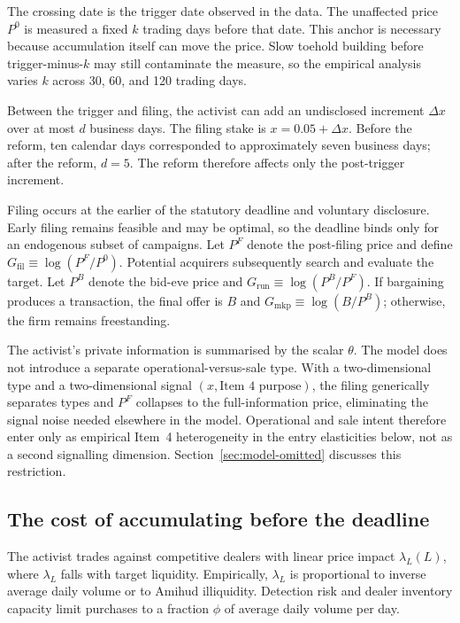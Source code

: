 The crossing date is the trigger date observed in the data. The unaffected
price $P^0$ is measured a fixed $k$ trading days before that date. This anchor
is necessary because accumulation itself can move the price. Slow toehold
building before trigger-minus-$k$ may still contaminate the measure, so the
empirical analysis varies $k$ across 30, 60, and 120 trading days.

Between the trigger and filing, the activist can add an undisclosed increment
$\Delta x$ over at most $d$ business days. The filing stake is
$x=0.05+\Delta x$. Before the reform, ten calendar days corresponded to
approximately seven business days; after the reform, $d=5$. The reform
therefore affects only the post-trigger increment.

Filing occurs at the earlier of the statutory deadline and voluntary
disclosure. Early filing remains feasible and may be optimal, so the deadline
binds only for an endogenous subset of campaigns. Let $P^F$ denote the
post-filing price and define $G_{\mathrm{fil}}\equiv\log(P^F/P^0)$. Potential
acquirers subsequently search and evaluate the target. Let $P^B$ denote the
bid-eve price and $G_{\mathrm{run}}\equiv\log(P^B/P^F)$. If bargaining produces
a transaction, the final offer is $B$ and
$G_{\mathrm{mkp}}\equiv\log(B/P^B)$; otherwise, the firm remains freestanding.

The activist's private information is summarised by the scalar $\theta$. The
model does not introduce a separate operational-versus-sale type. With a
two-dimensional type and a two-dimensional signal
$(x,\text{Item 4 purpose})$, the filing generically separates types and $P^F$
collapses to the full-information price, eliminating the signal noise needed
elsewhere in the model. Operational and sale intent therefore enter only as
empirical Item~4 heterogeneity in the entry elasticities below, not as a second
signalling dimension. Section~\ref{sec:model-omitted} discusses this restriction.

\subsection{The cost of accumulating before the deadline}
\label{sec:model-cost}

The activist trades against competitive dealers with linear price impact
$\lambda_L(L)$, where $\lambda_L$ falls with target liquidity. Empirically,
$\lambda_L$ is proportional to inverse average daily volume or to Amihud
illiquidity. Detection risk and dealer inventory capacity limit purchases to a
fraction $\phi$ of average daily volume per day.


